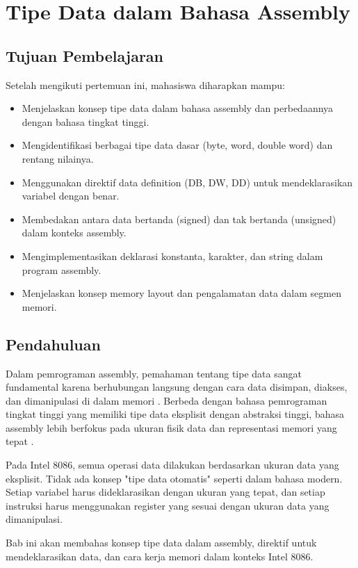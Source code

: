 \documentclass[../main.tex]{subfiles}
\begin{document}
\chapter{Tipe Data dalam Bahasa Assembly}

\section{Tujuan Pembelajaran}
Setelah mengikuti pertemuan ini, mahasiswa diharapkan mampu:
\begin{itemize}
    \item Menjelaskan konsep tipe data dalam bahasa assembly dan perbedaannya dengan bahasa tingkat tinggi.
    \item Mengidentifikasi berbagai tipe data dasar (byte, word, double word) dan rentang nilainya.
    \item Menggunakan direktif data definition (DB, DW, DD) untuk mendeklarasikan variabel dengan benar.
    \item Membedakan antara data bertanda (signed) dan tak bertanda (unsigned) dalam konteks assembly.
    \item Mengimplementasikan deklarasi konstanta, karakter, dan string dalam program assembly.
    \item Menjelaskan konsep memory layout dan pengalamatan data dalam segmen memori.
\end{itemize}

\section{Pendahuluan}
Dalam pemrograman assembly, pemahaman tentang tipe data sangat fundamental karena berhubungan langsung dengan cara data disimpan, diakses, dan dimanipulasi di dalam memori \cite{assembly_language_programming_guide}. Berbeda dengan bahasa pemrograman tingkat tinggi yang memiliki tipe data eksplisit dengan abstraksi tinggi, bahasa assembly lebih berfokus pada ukuran fisik data dan representasi memori yang tepat \cite{tutorials_point_assembly}.

Pada Intel 8086, semua operasi data dilakukan berdasarkan ukuran data yang eksplisit. Tidak ada konsep "tipe data otomatis" seperti dalam bahasa modern. Setiap variabel harus dideklarasikan dengan ukuran yang tepat, dan setiap instruksi harus menggunakan register yang sesuai dengan ukuran data yang dimanipulasi.

Bab ini akan membahas konsep tipe data dalam assembly, direktif untuk mendeklarasikan data, dan cara kerja memori dalam konteks Intel 8086.
\end{document}
